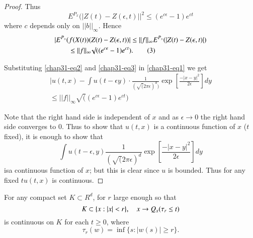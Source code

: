 \begin{proof}
Thus
$$
E^{P_{x}}(|Z(t)-Z(\epsilon,t)||^{2}\leq (e^{c\epsilon}-1)e^{ct}
$$
where $c$ depends only on $||b||_{\infty}$. Hence
\begin{align*}
& |E^{P_{x}}(f(X(t))(Z(t)-Z(\epsilon,t))|\leq
||f||_{\infty}E^{P_{x}}(|Z(t)-Z(\epsilon,t)|)\\ 
&\qquad \leq ||f||_{\infty}\surd
((e^{c\epsilon}-1)e^{ct}).\tag{3}\label{chap31-eq3} 
\end{align*}

Substituting \eqref{chap31-eq2} and \eqref{chap31-eq3} in
\eqref{chap31-eq1} we get
\begin{gather*}
|u(t,x)-\int u(t-\epsilon y)\cdot \frac{1}{(\surd (2\pi
  \epsilon)^{d})}\exp \left[\frac{-|x-y|^{2}}{2\epsilon}\right]dy\\
\leq ||f||_{\infty}\surd ((e^{c\epsilon}-1)e^{ct})
\end{gather*}

Note that the right hand side is independent of $x$ and as
$\epsilon\to 0$ the right hand side converges to $0$. Thus to show
that $u(t,x)$ is a continuous function of $x$ ($t$ fixed), it is
enough to show that
$$
\int u(t-\epsilon,y)\frac{1}{(\surd (2\pi\epsilon)^{d}}\exp
\left[\frac{-|x-y|^{2}}{2\epsilon}\right]dy 
$$
is\pageoriginale a continuous function of $x$; but this is clear since
$u$ is bounded. Thus for any fixed $tu(t,x)$ is continuous.
\end{proof}

\begin{lemma}\label{chap31-lem2}
For any compact set $K\subset R^{d}$, for $r$ large enough so that 
$$
K\subset \{x:|x|<r\},\quad x\to Q_{x}(\tau_{r}\leq t)
$$
is continuous on $K$ for each $t\geq 0$, where
$$
\tau_{r}(w)=\inf \{s:|w(s)|\geq r\}.
$$
\end{lemma}


